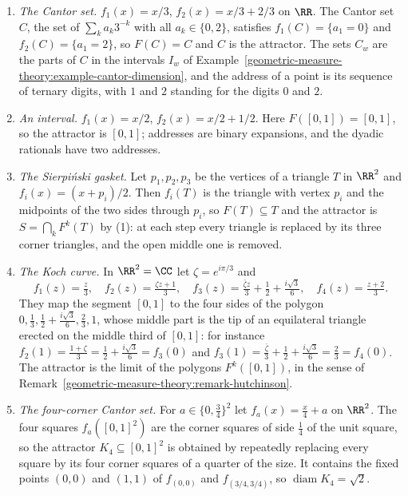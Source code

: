 \begin{example}\label{geometric-measure-theory:example-ifs}
\begin{enumerate}
\item \emph{The Cantor set.} $f_1(x) = x/3$, $f_2(x) = x/3 + 2/3$ on $\RR$. The Cantor set $C$, the set of $\sum_ka_k3^{-k}$ with all $a_k \in \{0, 2\}$, satisfies $f_1(C) = \{a_1 = 0\}$ and
$f_2(C) = \{a_1 = 2\}$, so $F(C) = C$ and $C$ is the attractor. The sets $C_w$ are the parts of $C$ in the intervals $I_w$ of Example~\ref{geometric-measure-theory:example-cantor-dimension}, and the
address of a point is its sequence of ternary digits, with $1$ and $2$ standing for the digits $0$ and $2$.
\item \emph{An interval.} $f_1(x) = x/2$, $f_2(x) = x/2 + 1/2$. Here $F([0, 1]) = [0, 1]$, so the attractor is $[0, 1]$; addresses are binary expansions, and the dyadic rationals have two addresses.
\item \emph{The Sierpi\'nski gasket.} Let $p_1, p_2, p_3$ be the vertices of a triangle $T$ in $\RR^2$ and $f_i(x) = (x + p_i)/2$. Then $f_i(T)$ is the triangle with vertex $p_i$ and the midpoints of the two
sides through $p_i$, so $F(T) \subseteq T$ and the attractor is $S = \bigcap_kF^k(T)$ by (1): at each step every triangle is replaced by its three corner triangles, and the open middle one is
removed.
\item \emph{The Koch curve.} In $\RR^2 = \CC$ let $\zeta = e^{i\pi/3}$ and
\[
f_1(z) = \tfrac z3, \quad f_2(z) = \tfrac{\zeta z + 1}{3}, \quad f_3(z) = \tfrac{\bar{\zeta}z}{3} + \tfrac12 + \tfrac{i\sqrt3}{6}, \quad f_4(z) = \tfrac{z + 2}{3}.
\]
They map the segment $[0, 1]$ to the four sides of the polygon $0, \frac13, \frac12 + \frac{i\sqrt3}{6}, \frac23, 1$, whose middle part is the tip of an equilateral triangle erected on the middle third
of $[0, 1]$: for instance $f_2(1) = \frac{1 + \zeta}{3} = \frac12 + \frac{i\sqrt3}{6} = f_3(0)$ and $f_3(1) = \frac{\bar{\zeta}}{3} + \frac12 + \frac{i\sqrt3}{6} = \frac23 = f_4(0)$. The attractor is the
limit of the polygons $F^k([0, 1])$, in the sense of Remark~\ref{geometric-measure-theory:remark-hutchinson}.
\item \emph{The four-corner Cantor set.} For $a \in \{0, \frac34\}^2$ let $f_a(x) = \frac x4 + a$ on $\RR^2$. The four squares $f_a([0, 1]^2)$ are the corner squares of side $\frac14$ of the unit
square, so the attractor $K_4 \subseteq [0, 1]^2$ is obtained by repeatedly replacing every square by its four corner squares of a quarter of the size. It contains the fixed points $(0, 0)$ and
$(1, 1)$ of $f_{(0, 0)}$ and $f_{(3/4, 3/4)}$, so $\operatorname{diam}K_4 = \sqrt2$.
\end{enumerate}
\end{example}

